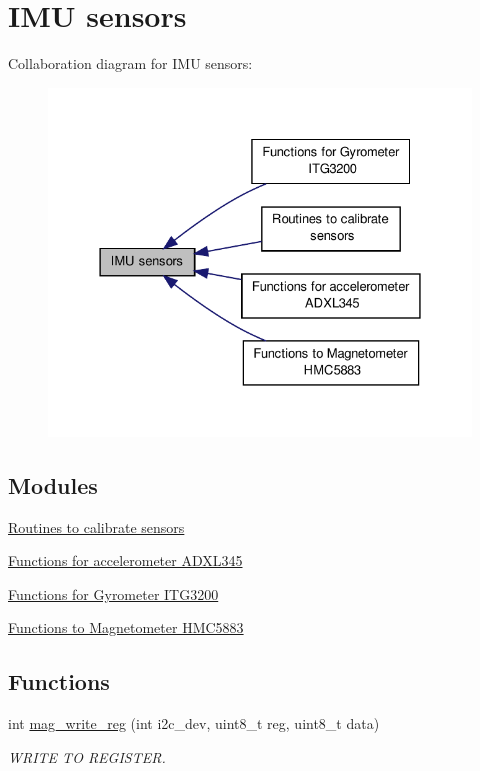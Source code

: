 \hypertarget{group__imu}{\section{I\-M\-U sensors}
\label{group__imu}
}
Collaboration diagram for I\-M\-U sensors\-:\nopagebreak
\begin{figure}[H]
\begin{center}
\leavevmode
\includegraphics[width=328pt]{group__imu}
\end{center}
\end{figure}
\subsection*{Modules}
\begin{DoxyCompactItemize}
\item 
\hyperlink{group__calibrate}{Routines to calibrate sensors}
\item 
\hyperlink{group__acc}{Functions for accelerometer A\-D\-X\-L345}
\item 
\hyperlink{group__gyr}{Functions for Gyrometer I\-T\-G3200}
\item 
\hyperlink{group__mag}{Functions to Magnetometer H\-M\-C5883}
\end{DoxyCompactItemize}
\subsection*{Functions}
\begin{DoxyCompactItemize}
\item 
int \hyperlink{group__imu_gab5d0ae421cd4bb10b1b7a1eda167416b}{mag\-\_\-write\-\_\-reg} (int i2c\-\_\-dev, uint8\-\_\-t reg, uint8\-\_\-t data)
\begin{DoxyCompactList}\small\item\em W\-R\-I\-T\-E T\-O R\-E\-G\-I\-S\-T\-E\-R. \end{DoxyCompactList}\end{DoxyCompactItemize}


